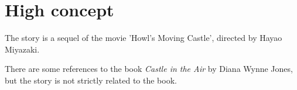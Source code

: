 \section{High concept}

The story is a sequel of the movie 'Howl’s Moving Castle', directed by Hayao Miyazaki.

There are some references to the book \textit{Castle in the Air} by Diana Wynne Jones, but the story is not strictly related to the book.
